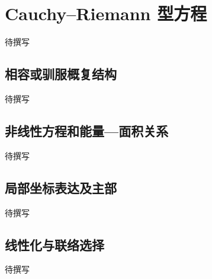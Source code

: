 
% 
% 

\section{Cauchy–Riemann 型方程}
\label{g4:sec:2201}

待撰写

\subsection{相容或驯服概复结构}
\label{g4:subsec:2201:01}
待撰写

\subsection{非线性方程和能量—面积关系}
\label{g4:subsec:2201:02}
待撰写

\subsection{局部坐标表达及主部}
\label{g4:subsec:2201:03}
待撰写

\subsection{线性化与联络选择}
\label{g4:subsec:2201:04}
待撰写
